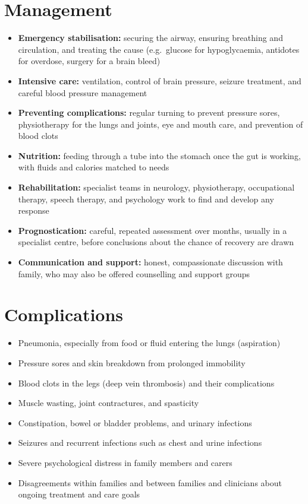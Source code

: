 \section*{Management}
\begin{itemize}
    \item \textbf{Emergency stabilisation:} securing the airway, ensuring breathing and circulation, and treating the cause (e.g.\ glucose for hypoglycaemia, antidotes for overdose, surgery for a brain bleed)
    \item \textbf{Intensive care:} ventilation, control of brain pressure, seizure treatment, and careful blood pressure management
    \item \textbf{Preventing complications:} regular turning to prevent pressure sores, physiotherapy for the lungs and joints, eye and mouth care, and prevention of blood clots
    \item \textbf{Nutrition:} feeding through a tube into the stomach once the gut is working, with fluids and calories matched to needs
    \item \textbf{Rehabilitation:} specialist teams in neurology, physiotherapy, occupational therapy, speech therapy, and psychology work to find and develop any response
    \item \textbf{Prognostication:} careful, repeated assessment over months, usually in a specialist centre, before conclusions about the chance of recovery are drawn
    \item \textbf{Communication and support:} honest, compassionate discussion with family, who may also be offered counselling and support groups
\end{itemize}

\section*{Complications}
\begin{itemize}
    \item Pneumonia, especially from food or fluid entering the lungs (aspiration)
    \item Pressure sores and skin breakdown from prolonged immobility
    \item Blood clots in the legs (deep vein thrombosis) and their complications
    \item Muscle wasting, joint contractures, and spasticity
    \item Constipation, bowel or bladder problems, and urinary infections
    \item Seizures and recurrent infections such as chest and urine infections
    \item Severe psychological distress in family members and carers
    \item Disagreements within families and between families and clinicians about ongoing treatment and care goals
\end{itemize}

